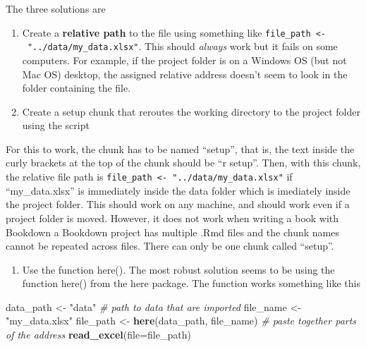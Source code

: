\documentclass[]{book}
\newenvironment{Shaded}{\begin{snugshade}}{\end{snugshade}}
\newcommand{\KeywordTok}[1]{\textcolor[rgb]{0.13,0.29,0.53}{\textbf{#1}}}
\newcommand{\DataTypeTok}[1]{\textcolor[rgb]{0.13,0.29,0.53}{#1}}
\newcommand{\StringTok}[1]{\textcolor[rgb]{0.31,0.60,0.02}{#1}}
\newcommand{\CommentTok}[1]{\textcolor[rgb]{0.56,0.35,0.01}{\textit{#1}}}
\newcommand{\OperatorTok}[1]{\textcolor[rgb]{0.81,0.36,0.00}{\textbf{#1}}}
\newcommand{\NormalTok}[1]{#1}
\providecommand{\tightlist}{%
  \setlength{\itemsep}{0pt}\setlength{\parskip}{0pt}}
\begin{document}
The three solutions are

\begin{enumerate}
\def\labelenumi{\arabic{enumi}.}
\tightlist
\item
  Create a \textbf{relative path} to the file using something like
  \texttt{file\_path\ \textless{}-\ "../data/my\_data.xlsx"}. This
  should \emph{always} work but it fails on some computers. For example,
  if the project folder is on a Windows OS (but not Mac OS) desktop, the
  assigned relative address doesn't seem to look in the folder
  containing the file.
\item
  Create a setup chunk that reroutes the working directory to the
  project folder using the script
\end{enumerate}

\begin{Shaded}
\end{Shaded}

For this to work, the chunk has to be named ``setup'', that is, the text
inside the curly brackets at the top of the chunk should be ``r setup''.
Then, with this chunk, the relative file path is
\texttt{file\_path\ \textless{}-\ "../data/my\_data.xlsx"} if
``my\_data.xlsx'' is immediately inside the data folder which is
imediately inside the project folder. This should work on any machine,
and should work even if a project folder is moved. However, it does not
work when writing a book with Bookdown a Bookdown project has multiple
.Rmd files and the chunk names cannot be repeated across files. There
can only be one chunk called ``setup''.

\begin{enumerate}
\def\labelenumi{\arabic{enumi}.}
\setcounter{enumi}{2}
\tightlist
\item
  Use the function here(). The most robust solution seems to be using
  the function here() from the here package. The function works
  something like this
\end{enumerate}

\begin{Shaded}
\begin{Highlighting}[]
\NormalTok{data_path <-}\StringTok{ "data"} \CommentTok{# path to data that are imported}
\NormalTok{file_name <-}\StringTok{ "my_data.xlsx"}
\NormalTok{file_path <-}\StringTok{ }\KeywordTok{here}\NormalTok{(data_path, file_name) }\CommentTok{# paste together parts of the address}
\KeywordTok{read_excel}\NormalTok{(}\DataTypeTok{file=}\NormalTok{file_path)}
\end{Highlighting}
\end{Shaded}
\end{document}
